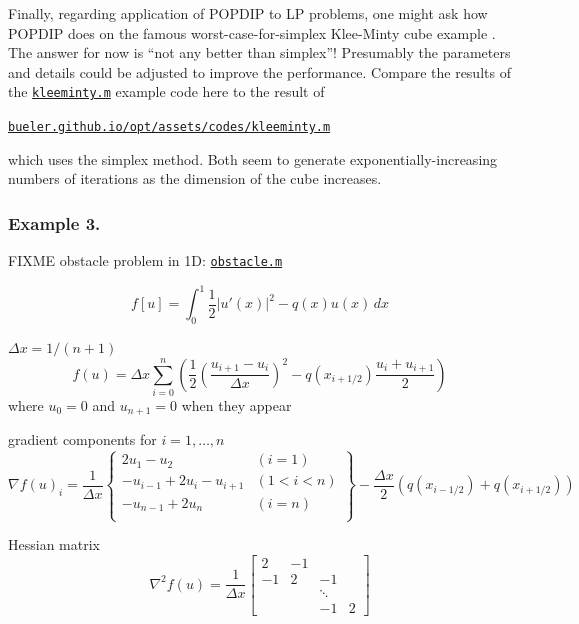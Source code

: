 \documentclass[11pt]{article}
\newcommand{\grad}{\nabla}
\begin{document}
Finally, regarding application of POPDIP to LP problems, one might ask how POPDIP does on the famous worst-case-for-simplex Klee-Minty cube example \cite[chapter 9]{GrivaNashSofer2009}.  The answer for now is ``not any better than simplex''!   Presumably the parameters and details could be adjusted to improve the performance.  Compare the results of the \href{https://github.com/bueler/popdip/blob/main/matlab/kleeminty.m}{\texttt{kleeminty.m}} example code here to the result of

\medskip
\centerline{\href{https://bueler.github.io/opt/assets/codes/kleeminty.m}{\texttt{bueler.github.io/opt/assets/codes/kleeminty.m}}}

\medskip
\noindent which uses the simplex method.  Both seem to generate exponentially-increasing numbers of iterations as the dimension of the cube increases.


\subsubsection*{Example 3.}

FIXME obstacle problem in 1D: \href{https://github.com/bueler/popdip/blob/main/matlab/obstacle.m}{\texttt{obstacle.m}}

\begin{equation}
    f[u] = \int_0^1 \frac{1}{2} |u'(x)|^2 - q(x) u(x)\,dx \label{obstaclefunctional}
\end{equation}

$\Delta x = 1 / (n+1)$
\begin{equation}
    f(u) = \Delta x \sum_{i=0}^n \left(\frac{1}{2} \left(\frac{u_{i+1}-u_i}{\Delta x}\right)^2 - q(x_{i+1/2}) \frac{u_i + u_{i+1}}{2}\right) \label{obstacleobjective}
\end{equation}
where $u_0=0$ and $u_{n+1}=0$ when they appear

gradient components for $i=1,\dots,n$
\begin{equation}
\grad f(u)_i = \frac{1}{\Delta x} \left\{\begin{matrix}
2 u_1 - u_2 & (i=1) \\
-u_{i-1} + 2 u_i - u_{i+1} & (1<i<n) \\
-u_{n-1} + 2 u_n & (i=n) \\
\end{matrix} \right\} - \frac{\Delta x}{2} (q(x_{i-1/2}) + q(x_{i+1/2}))
\end{equation}

Hessian matrix
\begin{equation}
\grad^2 f(u) = \frac{1}{\Delta x} \begin{bmatrix}
2  & -1 &    &    \\
-1 &  2 & -1 &    \\
   &    & \ddots &\\
   &    & -1 &  2
\end{bmatrix}
\end{equation}
\end{document}
